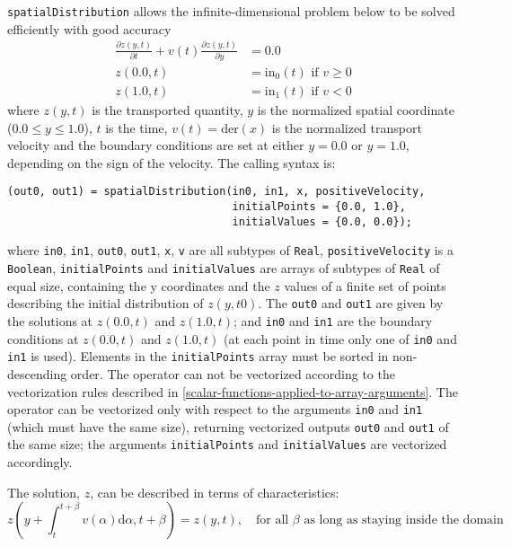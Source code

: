 \lstinline!spatialDistribution! allows the infinite-dimensional problem below to be solved efficiently with good accuracy
\begin{align*}
\frac{\partial z(y,t)}{\partial t}+v(t)\frac{\partial z(y,t)}{\partial y} &= 0.0\\
z(0.0, t) &= \mathrm{in}_0(t) \text{ if $v\ge 0$}\\
z(1.0, t) &= \mathrm{in}_1(t) \text{ if $v<0$}
\end{align*}
where $z(y, t)$ is the transported quantity, $y$ is the
normalized spatial coordinate ($0.0 \le y \le 1.0$), $t$ is the
time, $v(t)=\mathrm{der}(x)$ is the normalized
transport velocity and the boundary conditions are set at either
$y=0.0$ or $y=1.0$, depending on the sign of the velocity.
The calling syntax is:
\begin{lstlisting}[language=modelica]
(out0, out1) = spatialDistribution(in0, in1, x, positiveVelocity,
                                   initialPoints = {0.0, 1.0},
                                   initialValues = {0.0, 0.0});
\end{lstlisting}
where \lstinline!in0!, \lstinline!in1!, \lstinline!out0!, \lstinline!out1!, \lstinline!x!, \lstinline!v! are all subtypes of \lstinline!Real!, \lstinline!positiveVelocity! is a \lstinline!Boolean!, \lstinline!initialPoints! and \lstinline!initialValues! are arrays of subtypes of \lstinline!Real! of equal size, containing the y coordinates and the $z$ values of a finite set of points describing the initial distribution of $z(y, \mathit{t0})$.
The \lstinline!out0! and \lstinline!out1! are given by the solutions at $z(0.0, t)$ and $z(1.0, t)$; and \lstinline!in0! and \lstinline!in1! are the boundary conditions at $z(0.0, t)$ and $z(1.0, t)$ (at each point in time only one of \lstinline!in0! and \lstinline!in1! is used).
Elements in the \lstinline!initialPoints! array must be sorted in non-descending order.
The operator can not be vectorized according to the vectorization rules described in \cref{scalar-functions-applied-to-array-arguments}.
The operator can be vectorized only with respect to the arguments \lstinline!in0! and \lstinline!in1! (which must have the same size), returning vectorized outputs \lstinline!out0! and \lstinline!out1! of the same size; the arguments \lstinline!initialPoints! and \lstinline!initialValues! are vectorized accordingly.

The solution, $z$, can be described in terms of characteristics:
\begin{equation*}
z(y+\int_{t}^{t+\beta} v(\alpha) \mathrm{d}\alpha, t+\beta) = z(y, t),\quad\text{for all $\beta$ as long as staying inside the domain}
\end{equation*}

